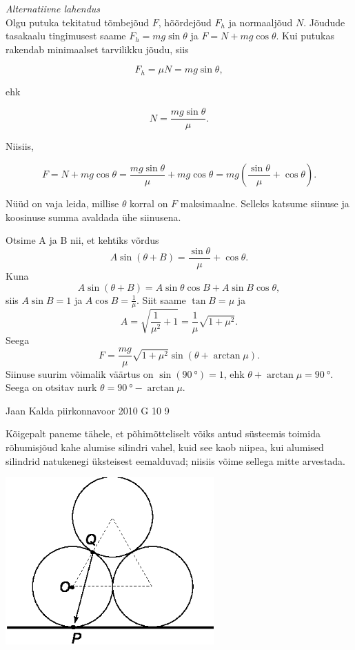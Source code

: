 \documentclass[11pt, twoside]{article}
\begin{document}
{{\vspace{0.5\baselineskip}

{\em Alternatiivne lahendus}\\ 
Olgu putuka tekitatud tõmbejõud $F$, hõõrdejõud $F_h$ ja normaaljõud $N$. Jõudude tasakaalu tingimusest saame
$F_{h}=mg\sin\theta$ ja $F=N+mg\cos\theta$. Kui putukas rakendab minimaalset tarvilikku jõudu, siis 

$$F_{h}=\mu N=mg\sin\theta,$$

ehk

$$N=\frac{mg\sin\theta}{\mu}.$$

Niisiis,

$$F=N+mg\cos\theta=\frac{mg\sin\theta}{\mu}+mg\cos\theta=mg\left( \frac{\sin\theta}{\mu}+\cos\theta\right).$$

Nüüd on vaja leida, millise $\theta$ korral on $F$ maksimaalne. Selleks katsume siinuse ja koosinuse summa avaldada ühe siinusena. 

Otsime A ja B nii, et kehtiks võrdus 
\[
A\sin (\theta+B)=\frac{\sin\theta}{\mu}+\cos\theta.
\]
Kuna 
\[
A\sin (\theta+B)=A\sin\theta\cos B + A\sin B \cos\theta,
\]
siis 
$A\sin B=1$ ja $A\cos B=\frac{1}{\mu}$. Siit saame $\tan B=\mu$ ja 
\[
A=\sqrt{\frac{1}{{\mu}^2} + 1}=\frac{1}{\mu}\sqrt{1+{\mu}^2}.
\]
Seega 
\[
F=\frac{mg}{\mu}\sqrt{1+{\mu}^2}\sin(\theta + \arctan\mu).
\]
Siinuse suurim võimalik väärtus on $\sin(\SI{90}{\degree})=1$, ehk $\theta + \arctan\mu=\SI{90}{\degree}$. Seega on otsitav nurk $\theta = \SI{90}{\degree}-\arctan\mu$.
\fi
}

{Jaan Kalda} %
{piirkonnavoor} %
{2010} %
{G 10} %
{9} %
{

\ifSolution
Kõigepalt paneme tähele, et põhimõtteliselt võiks antud süsteemis toimida rõhumisjõud kahe alumise silindri vahel, kuid see
kaob niipea, kui alumised silindrid natukenegi üksteisest eemalduvad; niisiis võime sellega mitte arvestada.

\begin{center}
	\includegraphics[width=0.6\textwidth]{2010-v2g-10-torudlah.eps}
\end{center}

}}
\end{document}
